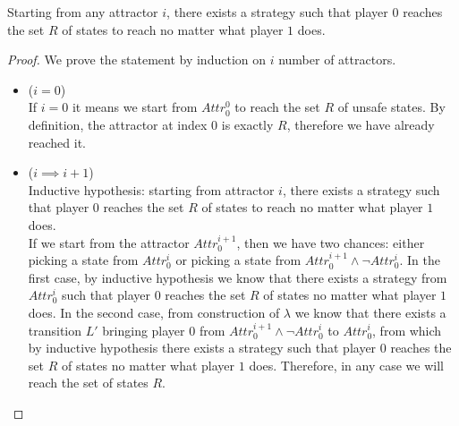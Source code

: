 \begin{theorem}
Starting from any attractor $i$, there exists a strategy such that player $0$ reaches the set $R$ of states to reach no matter what player $1$ does.

\begin{proof}
We prove the statement by induction on $i$ number of attractors.
\begin{itemize}
    \item ($i = 0$) \\
    If $i = 0$ it means we start from $Attr_0^0$ to reach the set $R$ of unsafe states. 
    By definition, the attractor at index $0$ is exactly $R$, therefore we have already reached it.

    \item ($i \implies i+1$) \\
    Inductive hypothesis: starting from attractor $i$, there exists a strategy such that player $0$ reaches the set $R$ of states to reach no matter what player $1$ does. \\
    If we start from the attractor $Attr_0^{i+1}$, then we have two chances: either picking a state from $Attr_0^i$ or picking a state from $Attr_0^{i+1} \land \neg Attr_0^i$.
    In the first case, by inductive hypothesis we know that there exists a strategy from $Attr_0^i$ such that player $0$ reaches the set $R$ of states no matter what player $1$ does. 
    In the second case, from construction of $\lambda$ we know that there exists a transition $L'$ bringing player $0$ from $Attr_0^{i+1} \land \neg Attr_0^{i}$ to $Attr_0^i$, from which by inductive hypothesis there exists a strategy such that player $0$ reaches the set $R$ of states no matter what player $1$ does.
    Therefore, in any case we will reach the set of states $R$. 
\end{itemize}
\end{proof}
\end{theorem}
